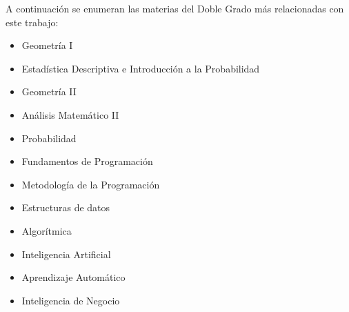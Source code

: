 A continuación se enumeran las materias del Doble Grado más relacionadas con este trabajo:
\begin{itemize}
\item Geometría I
\item Estadística Descriptiva e Introducción a la Probabilidad
\item Geometría II
\item Análisis Matemático II
\item Probabilidad
\item Fundamentos de Programación
\item Metodología de la Programación
\item Estructuras de datos
\item Algorítmica
\item Inteligencia Artificial
\item Aprendizaje Automático
\item Inteligencia de Negocio
\end{itemize}